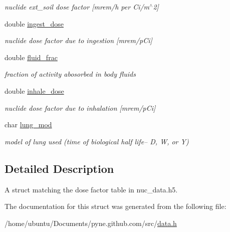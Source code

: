 \begin{DoxyCompactItemize}
\begin{DoxyCompactList}\small\item\em nuclide ext\+\_\+soil dose factor \mbox{[}mrem/h per Ci/m$^\wedge$2\mbox{]} \end{DoxyCompactList}\item 
double \hyperlink{structpyne_1_1dose_a96dc0ff17888672afb40c82b3c6bb996}{ingest\+\_\+dose}\hypertarget{structpyne_1_1dose_a96dc0ff17888672afb40c82b3c6bb996}{}\label{structpyne_1_1dose_a96dc0ff17888672afb40c82b3c6bb996}

\begin{DoxyCompactList}\small\item\em nuclide dose factor due to ingestion \mbox{[}mrem/p\+Ci\mbox{]} \end{DoxyCompactList}\item 
double \hyperlink{structpyne_1_1dose_ac5aad706f373cee64e286f6191f753c2}{fluid\+\_\+frac}\hypertarget{structpyne_1_1dose_ac5aad706f373cee64e286f6191f753c2}{}\label{structpyne_1_1dose_ac5aad706f373cee64e286f6191f753c2}

\begin{DoxyCompactList}\small\item\em fraction of activity abosorbed in body fluids \end{DoxyCompactList}\item 
double \hyperlink{structpyne_1_1dose_ade66b3422bf24883142e0de856d67228}{inhale\+\_\+dose}\hypertarget{structpyne_1_1dose_ade66b3422bf24883142e0de856d67228}{}\label{structpyne_1_1dose_ade66b3422bf24883142e0de856d67228}

\begin{DoxyCompactList}\small\item\em nuclide dose factor due to inhalation \mbox{[}mrem/p\+Ci\mbox{]} \end{DoxyCompactList}\item 
char \hyperlink{structpyne_1_1dose_afc70c9461a6c1e3348a90e66747db41e}{lung\+\_\+mod}\hypertarget{structpyne_1_1dose_afc70c9461a6c1e3348a90e66747db41e}{}\label{structpyne_1_1dose_afc70c9461a6c1e3348a90e66747db41e}

\begin{DoxyCompactList}\small\item\em model of lung used (time of biological half life-- D, W, or Y) \end{DoxyCompactList}\end{DoxyCompactItemize}


\subsection{Detailed Description}
A struct matching the dose factor table in nuc\+\_\+data.\+h5. 

The documentation for this struct was generated from the following file\+:\begin{DoxyCompactItemize}
\item 
/home/ubuntu/\+Documents/pyne.\+github.\+com/src/\hyperlink{data_8h}{data.\+h}\end{DoxyCompactItemize}
